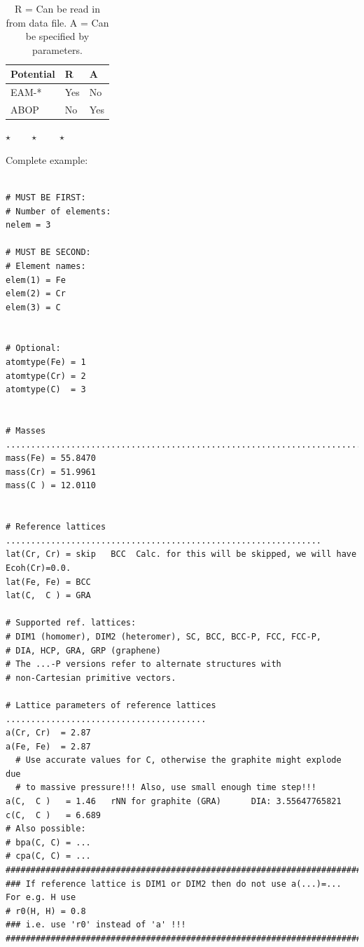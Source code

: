 \documentclass[a4paper,12pt,pdftex,onecolumn]{article}
\newcommand{\stars}{\begin{center}%
\vspace{1em plus 0.5em minus 0.5em}%
$\star \qquad \star \qquad \star$%
\vspace{1em plus 0.5em minus 0.5em}%
\end{center}}
\begin{document}
\begin{table}[!h]
\caption{
R = Can be read in from data file.
A = Can be specified by parameters.
\label{tab:pot-da}
}
\begin{center}
\begin{tabular}{|l|l|l|}
\hline
\hline
Potential   & R    & A  \\
\hline
EAM-*       & Yes  & No \\
ABOP        & No   & Yes \\
\hline
\hline
\end{tabular}
\end{center}
\end{table}

\stars


Complete example:


\begin{Verbatim}[fontsize=\relsize{-1},frame=single]

# MUST BE FIRST:
# Number of elements:
nelem = 3

# MUST BE SECOND:
# Element names:
elem(1) = Fe
elem(2) = Cr
elem(3) = C


# Optional:
atomtype(Fe) = 1
atomtype(Cr) = 2
atomtype(C)  = 3


# Masses ...........................................................................
mass(Fe) = 55.8470
mass(Cr) = 51.9961
mass(C ) = 12.0110


# Reference lattices ...............................................................
lat(Cr, Cr) = skip   BCC  Calc. for this will be skipped, we will have Ecoh(Cr)=0.0.
lat(Fe, Fe) = BCC
lat(C,  C ) = GRA

# Supported ref. lattices:
# DIM1 (homomer), DIM2 (heteromer), SC, BCC, BCC-P, FCC, FCC-P,
# DIA, HCP, GRA, GRP (graphene)
# The ...-P versions refer to alternate structures with
# non-Cartesian primitive vectors.

# Lattice parameters of reference lattices ........................................
a(Cr, Cr)  = 2.87
a(Fe, Fe)  = 2.87
  # Use accurate values for C, otherwise the graphite might explode due
  # to massive pressure!!! Also, use small enough time step!!!
a(C,  C )   = 1.46   rNN for graphite (GRA)      DIA: 3.55647765821
c(C,  C )   = 6.689
# Also possible:
# bpa(C, C) = ...
# cpa(C, C) = ...
##################################################################################
### If reference lattice is DIM1 or DIM2 then do not use a(...)=... For e.g. H use
# r0(H, H) = 0.8
### i.e. use 'r0' instead of 'a' !!!
##################################################################################



\end{Verbatim}
\end{document}
